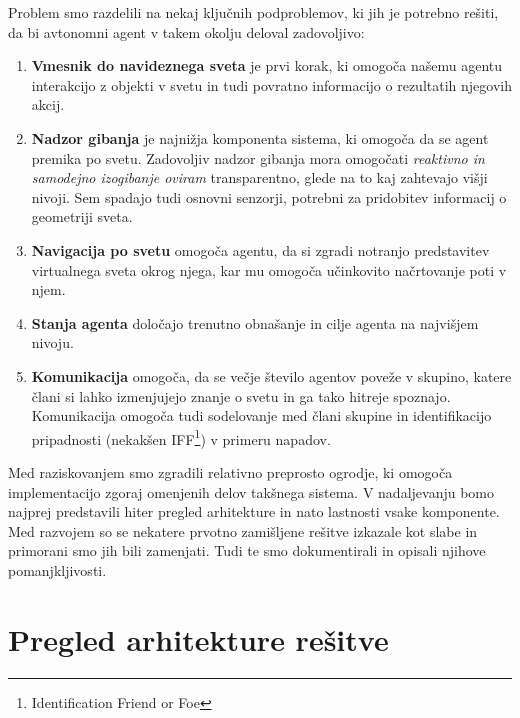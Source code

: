 \documentclass[a4paper,10pt]{article}
\begin{document}
Problem smo razdelili na nekaj ključnih podproblemov, ki jih je potrebno rešiti, da bi avtonomni agent v takem okolju deloval zadovoljivo:
\begin{enumerate}
  \item \textbf{Vmesnik do navideznega sveta} je prvi korak, ki omogoča našemu agentu interakcijo z objekti v svetu in tudi povratno informacijo o rezultatih njegovih akcij.
  
  \item \textbf{Nadzor gibanja} je najnižja komponenta sistema, ki omogoča da se agent premika po svetu. Zadovoljiv nadzor gibanja mora omogočati \textit{reaktivno in samodejno izogibanje oviram} transparentno, glede na to kaj zahtevajo višji nivoji. Sem spadajo tudi osnovni senzorji, potrebni za pridobitev informacij o geometriji sveta.
  
  \item \textbf{Navigacija po svetu} omogoča agentu, da si zgradi notranjo predstavitev virtualnega sveta okrog njega, kar mu omogoča učinkovito načrtovanje poti v njem.
  
  \item \textbf{Stanja agenta} določajo trenutno obnašanje in cilje agenta na najvišjem nivoju.
  
  \item \textbf{Komunikacija} omogoča, da se večje število agentov poveže v skupino, katere člani si lahko izmenjujejo znanje o svetu in ga tako hitreje spoznajo. Komunikacija omogoča tudi sodelovanje med člani skupine in identifikacijo pripadnosti (nekakšen IFF\footnote{Identification Friend or Foe}) v primeru napadov.
\end{enumerate}

Med raziskovanjem smo zgradili relativno preprosto ogrodje, ki omogoča implementacijo zgoraj omenjenih delov takšnega sistema. V nadaljevanju bomo najprej predstavili hiter pregled arhitekture in nato lastnosti vsake komponente. Med razvojem so se nekatere prvotno zamišljene rešitve izkazale kot slabe in primorani smo jih bili zamenjati. Tudi te smo dokumentirali in opisali njihove pomanjkljivosti.

\section{Pregled arhitekture rešitve}
\end{document}
